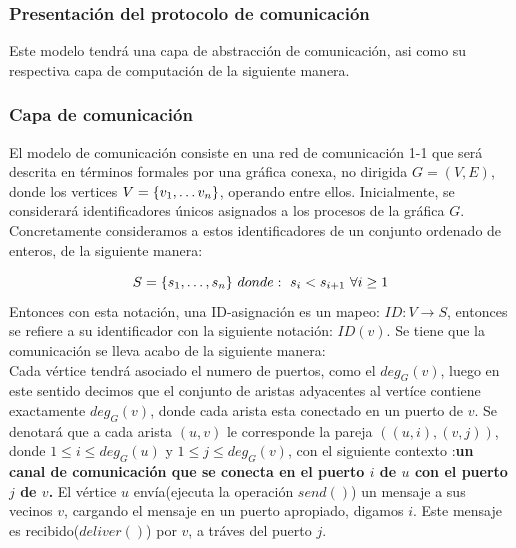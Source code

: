 \documentclass[10pt]{report}
\begin{document}
    \subsubsection{Presentación del protocolo de comunicación}
    Este modelo tendrá una capa de abstracción de comunicación, asi como su respectiva capa de
    computación de la siguiente manera.
    \subsubsection{Capa de comunicación}
    El modelo de comunicación consiste en una red de comunicación 1-1 que será descrita en términos formales por
    una gráfica conexa, no dirigida $G=(V,E)$, donde los vertices $V=\{ v_{1},\mathellipsis v_{n} \}$,\space
    operando entre ellos.
    Inicialmente, se considerará identificadores únicos asignados a los procesos de la gráfica $G$.\space
    Concretamente consideramos a estos identificadores de un conjunto ordenado de enteros, de la siguiente manera:

    \begin{equation}
        S = \{ s_{1},\mathellipsis,s_{n}\} \
        donde:\ s_{i} < s_{i+1} \ \forall i\geq 1\label{eq:equation}
    \end{equation}
    Entonces con esta notación, una ID-asignación es un mapeo:
    $ID:V\rightarrow S$, entonces se refiere a su identificador con la siguiente notación:
    $ID(v)$. \newline
    Se tiene que la comunicación se lleva acabo de la siguiente manera:\\
    \newline
    Cada vértice tendrá asociado el numero de puertos, como el $deg_{G}(v)$,
    luego en este sentido decimos que el conjunto de aristas adyacentes al vertíce
    contiene exactamente $deg_{G}(v)$, donde cada arista esta conectado en un puerto de $v$.
    \newline
    Se denotará que a cada arista $(u,v)$ le corresponde la pareja
    $((u,i),(v,j))$, donde $1\leq i \leq deg_{G}(u) $ y $1\leq j \leq deg_{G}(v)$,
    con el siguiente contexto :\newline \textbf{un canal de comunicación que se conecta en el puerto $i$  de $u$ con el puerto $j$ de
    $v$.}\newline
    El vértice $u$ envía(ejecuta la operación $send()$) un mensaje a sus vecinos $v$, cargando el mensaje en un puerto apropiado, digamos $i$.
    Este mensaje es recibido($deliver()$) por $v$, a tráves del puerto $j$. \newline
\end{document}
